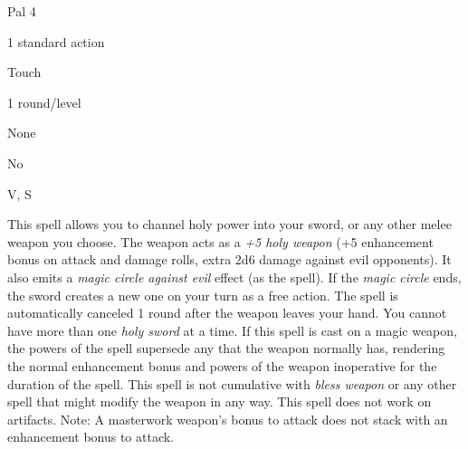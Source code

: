 
\begin{description*}
\item[Level:] Pal 4
\item[Casting Time:] 1 standard action
\item[Range:] Touch
\item[Duration:] 1 round/level
\item[Saving Throw:] None
\item[Spell Resistance:] No
\item[Components:] V, S
\end{description*}

This spell allows you to channel holy power into your sword, or any other melee
weapon you choose. The weapon acts as a \textit{+5 holy weapon} (+5 enhancement
bonus on attack and damage rolls, extra 2d6 damage against evil opponents). It
also emits a \textit{magic circle against evil} effect (as the spell). If the \textit{magic
circle} ends, the sword creates a new one on your turn as a free action. The spell
is automatically canceled 1 round after the weapon leaves your hand. You cannot
have more than one \textit{holy sword} at a time.
If this spell is cast on a magic weapon, the powers of the spell supersede any
that the weapon normally has, rendering the normal enhancement bonus and powers
of the weapon inoperative for the duration of the spell. This spell is not cumulative
with \textit{bless weapon} or any other spell that might modify the weapon in any
way.
This spell does not work on artifacts.
Note: A masterwork weapon's bonus to attack does not stack with an enhancement
bonus to attack.